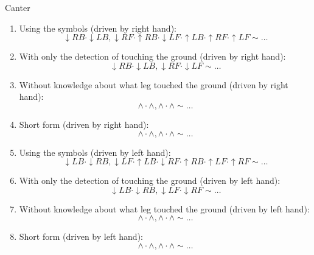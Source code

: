\begin{definition}{Canter}
	\begin{enumerate}
		\item Using the symbols (driven by right hand):
		$$ \downarrow RB \cdot \downarrow LB, \downarrow RF \cdot \uparrow RB \cdot \downarrow LF \cdot \uparrow LB \cdot \uparrow RF \cdot \uparrow LF \sim \dots $$
		\item With only the detection of touching the ground (driven by right hand):
		$$ \downarrow RB \cdot \downarrow LB, \downarrow RF \cdot \downarrow LF \sim \dots $$
		\item Without knowledge about what leg touched the ground (driven by right hand):
		$$ \wedge \cdot \wedge, \wedge \cdot \wedge \sim \dots $$
		\item Short form (driven by right hand):
		$$ \wedge \cdot \wedge, \wedge \cdot \wedge \sim \dots $$
		\item Using the symbols (driven by left hand):
		$$ \downarrow LB \cdot \downarrow RB, \downarrow LF \cdot \uparrow LB \cdot \downarrow RF \cdot \uparrow RB \cdot \uparrow LF \cdot \uparrow RF \sim \dots $$
		\item With only the detection of touching the ground (driven by left hand):
		$$ \downarrow LB \cdot \downarrow RB, \downarrow LF \cdot \downarrow RF \sim \dots $$
		\item Without knowledge about what leg touched the ground (driven by left hand):
		$$ \wedge \cdot \wedge, \wedge \cdot \wedge \sim \dots $$
		\item Short form (driven by left hand):
		$$ \wedge \cdot \wedge, \wedge \cdot \wedge \sim \dots $$
	\end{enumerate}
\end{definition}

